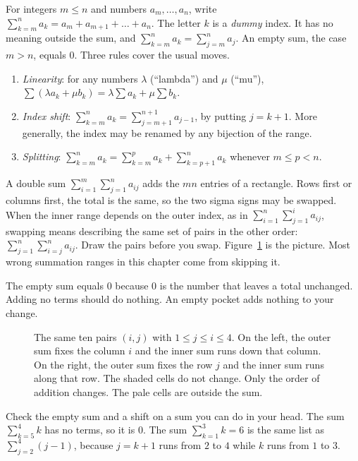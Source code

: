 \begin{definitionx}
For integers $m\le n$ and numbers $a_m,\dots,a_n$, write $\sum_{k=m}^na_k=a_m+a_{m+1}+\dots+a_n$. The letter $k$ is a \emph{dummy} index. It has no meaning outside the sum, and $\sum_{k=m}^na_k=\sum_{j=m}^na_j$. An empty sum, the case $m>n$, equals $0$. Three rules cover the usual moves.
\begin{enumerate}[label=(\roman*)]
\item \emph{Linearity}: for any numbers $\lambda$ (``lambda'') and $\mu$ (``mu''), $\sum(\lambda a_k+\mu b_k)=\lambda\sum a_k+\mu\sum b_k$.
\item \emph{Index shift}: $\sum_{k=m}^na_k=\sum_{j=m+1}^{n+1}a_{j-1}$, by putting $j=k+1$. More generally, the index may be renamed by any bijection of the range.
\item \emph{Splitting}: $\sum_{k=m}^na_k=\sum_{k=m}^pa_k+\sum_{k=p+1}^na_k$ whenever $m\le p<n$.
\end{enumerate}
A double sum $\sum_{i=1}^m\sum_{j=1}^na_{ij}$ adds the $mn$ entries of a rectangle. Rows first or columns first, the total is the same, so the two sigma signs may be swapped. When the inner range depends on the outer index, as in $\sum_{i=1}^n\sum_{j=1}^ia_{ij}$, swapping means describing the same set of pairs in the other order: $\sum_{j=1}^n\sum_{i=j}^na_{ij}$. Draw the pairs before you swap. Figure~\ref{fig:region} is the picture. Most wrong summation ranges in this chapter come from skipping it.
\end{definitionx}

The empty sum equals $0$ because $0$ is the number that leaves a total unchanged. Adding no terms should do nothing. An empty pocket adds nothing to your change.

\begin{figure}[ht]
\centering
{}
\caption{The same ten pairs $(i,j)$ with $1\le j\le i\le 4$. On the left, the outer sum fixes the column $i$ and the inner sum runs down that column. On the right, the outer sum fixes the row $j$ and the inner sum runs along that row. The shaded cells do not change. Only the order of addition changes. The pale cells are outside the sum.}
\label{fig:region}
\end{figure}

Check the empty sum and a shift on a sum you can do in your head. The sum $\sum_{k=5}^{4}k$ has no terms, so it is $0$. The sum $\sum_{k=1}^{3}k=6$ is the same list as $\sum_{j=2}^{4}(j-1)$, because $j=k+1$ runs from $2$ to $4$ while $k$ runs from $1$ to $3$.


